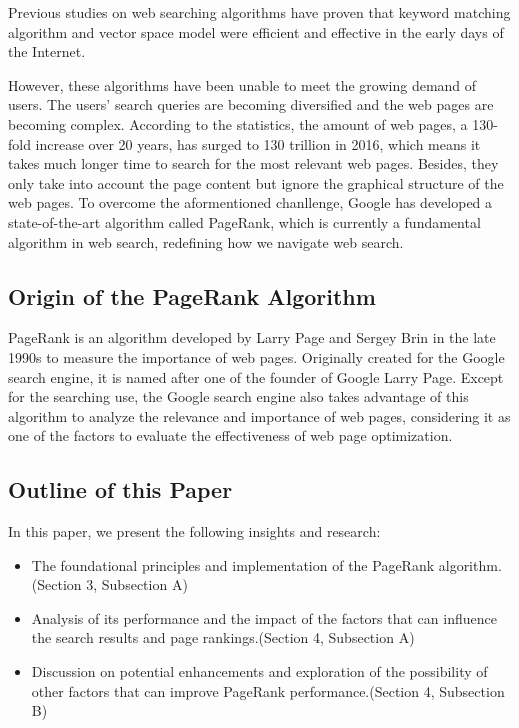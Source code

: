 \documentclass[lettersize,journal,12pt]{IEEEtran}
\begin{document}
Previous studies on web searching algorithms have proven that keyword matching algorithm\cite{ref1} and vector space model\cite{ref2} were efficient and effective in the early days of the Internet.

However, these algorithms have been unable to meet the growing demand of users. The users' search queries are becoming diversified and the web pages are becoming complex. 
According to the statistics, the amount of web pages, a 130-fold increase over 20 years, has surged to 130 trillion in 2016, which means it takes much longer time to search for the most relevant web pages.
Besides, they only take into account the page content but ignore the graphical structure of the web pages.
To overcome the aformentioned chanllenge, Google has developed a state-of-the-art algorithm called PageRank, which is currently a fundamental algorithm in web search, redefining how we navigate web search.

\subsection{Origin of the PageRank Algorithm} 

PageRank is an algorithm developed by Larry Page and Sergey Brin in the late 1990s to measure the importance of web pages. 
Originally created for the Google search engine, it is named after one of the founder of Google Larry Page. Except for the searching use, the Google search engine also takes advantage of this algorithm to analyze the relevance and importance of web pages, considering it as one of the factors to evaluate the effectiveness of web page optimization. 

\subsection{Outline of this Paper}

In this paper, we present the following insights and research:
\begin{itemize}
	\item The foundational principles and implementation of the PageRank algorithm.(Section 3, Subsection A)
	\item Analysis of its performance and the impact of the factors that can influence the search results and page rankings.(Section 4, Subsection A)
	\item Discussion on potential enhancements and exploration of the possibility of other factors that can improve PageRank performance.(Section 4, Subsection B)
\end{itemize}
\end{document}
